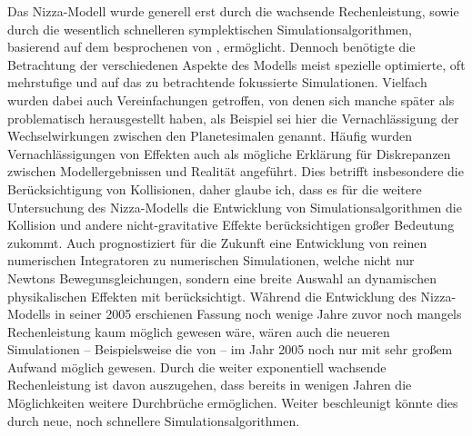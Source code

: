 \documentclass[12pt,a4paper,twoside]{article}
\renewcommand{\cite}{\citep}
\begin{document}
Das Nizza-Modell wurde generell erst durch die wachsende Rechenleistung, sowie durch die wesentlich schnelleren symplektischen Simulationsalgorithmen, basierend auf dem besprochenen von \cite{Wisdom1991}, ermöglicht. Dennoch benötigte die Betrachtung der verschiedenen Aspekte des Modells meist spezielle optimierte, oft mehrstufige und auf das zu betrachtende fokussierte Simulationen.
Vielfach wurden dabei auch Vereinfachungen getroffen, von denen sich manche später als problematisch herausgestellt haben, als Beispiel sei hier die Vernachlässigung der Wechselwirkungen zwischen den Planetesimalen genannt. Häufig wurden Vernachlässigungen von Effekten auch als mögliche Erklärung für Diskrepanzen zwischen Modellergebnissen und Realität angeführt.
Dies betrifft insbesondere die Berücksichtigung von Kollisionen, daher glaube ich, dass es für die weitere Untersuchung des Nizza-Modells die Entwicklung von Simulationsalgorithmen die Kollision und andere nicht-gravitative Effekte berücksichtigen großer Bedeutung zukommt.
Auch \cite{Morbidelli2002} prognostiziert für die Zukunft eine Entwicklung von reinen numerischen Integratoren zu numerischen Simulationen, welche nicht nur Newtons Bewegunsgleichungen, sondern eine breite Auswahl an dynamischen physikalischen Effekten mit berücksichtigt.
Während die Entwicklung des Nizza-Modells in seiner 2005 erschienen Fassung noch wenige Jahre zuvor noch mangels Rechenleistung kaum möglich gewesen wäre, wären auch die neueren Simulationen -- Beispielsweise die von \cite{Nesvorny2012} -- im Jahr 2005 noch nur mit sehr großem Aufwand möglich gewesen.
Durch die weiter exponentiell wachsende Rechenleistung ist davon auszugehen, dass bereits in wenigen Jahren die Möglichkeiten weitere Durchbrüche ermöglichen.
Weiter beschleunigt könnte dies durch neue, noch schnellere Simulationsalgorithmen.
\end{document}

